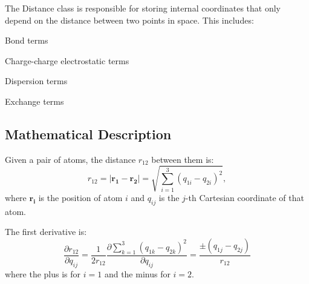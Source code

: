 The Distance class is responsible for storing internal coordinates that only depend on the distance between two points in space. This includes\+:
\begin{DoxyItemize}
\item Bond terms
\item Charge-\/charge electrostatic terms
\item Dispersion terms
\item Exchange terms
\end{DoxyItemize}

\subsection*{Mathematical Description}

Given a pair of atoms, the distance $r_{12}$ between them is\+: \[ r_{12}=|\mathbf{r_1}-\mathbf{r_2}|= \sqrt{\sum_{i=1}^3\left(q_{1i}-q_{2i}\right)^2}, \] where $\mathbf{r_i}$ is the position of atom $i$ and $q_{ij}$ is the $j$-\/th Cartesian coordinate of that atom.

The first derivative is\+: \[ \frac{\partial r_{12}}{\partial q_{ij}}=\frac{1}{2r_{12}} \frac{\partial \sum_{k=1}^3\left(q_{1k}-q_{2k}\right)^2}{\partial q_{ij}} =\frac{\pm \left(q_{1j}-q_{2j}\right)}{r_{12}} \] where the plus is for $i=1$ and the minus for $i=2$. 